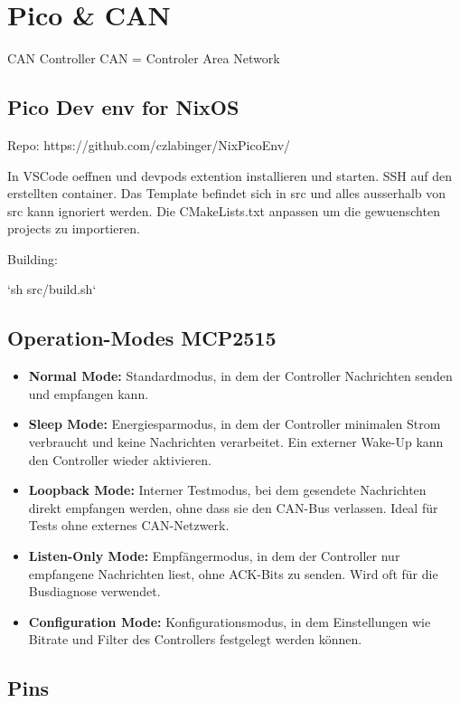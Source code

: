 \section{Pico & CAN}

CAN Controller
CAN = Controler Area Network

\subsection{Pico Dev env for NixOS}

Repo: https://github.com/czlabinger/NixPicoEnv/


In VSCode oeffnen und devpods extention installieren und starten. SSH auf den erstellten container.
Das Template befindet sich in src und alles ausserhalb von src kann ignoriert werden.
Die CMakeLists.txt anpassen um die gewuenschten projects zu importieren.

Building: 

`sh src/build.sh`

\subsection{Operation-Modes MCP2515}
\begin{itemize}
    \item \textbf{Normal Mode:} Standardmodus, in dem der Controller Nachrichten senden und empfangen kann.
    \item \textbf{Sleep Mode:} Energiesparmodus, in dem der Controller minimalen Strom verbraucht und keine Nachrichten verarbeitet. Ein externer Wake-Up kann den Controller wieder aktivieren.
    \item \textbf{Loopback Mode:} Interner Testmodus, bei dem gesendete Nachrichten direkt empfangen werden, ohne dass sie den CAN-Bus verlassen. Ideal für Tests ohne externes CAN-Netzwerk.
    \item \textbf{Listen-Only Mode:} Empfängermodus, in dem der Controller nur empfangene Nachrichten liest, ohne ACK-Bits zu senden. Wird oft für die Busdiagnose verwendet.
    \item \textbf{Configuration Mode:} Konfigurationsmodus, in dem Einstellungen wie Bitrate und Filter des Controllers festgelegt werden können.
\end{itemize}

\subsection{Pins}

